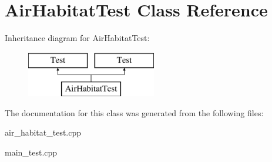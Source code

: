 \hypertarget{class_air_habitat_test}{}\section{Air\+Habitat\+Test Class Reference}
\label{class_air_habitat_test}
Inheritance diagram for Air\+Habitat\+Test\+:\begin{figure}[H]
\begin{center}
\leavevmode
\includegraphics[height=2.000000cm]{class_air_habitat_test}
\end{center}
\end{figure}


The documentation for this class was generated from the following files\+:\begin{DoxyCompactItemize}
\item 
air\+\_\+habitat\+\_\+test.\+cpp\item 
main\+\_\+test.\+cpp\end{DoxyCompactItemize}
